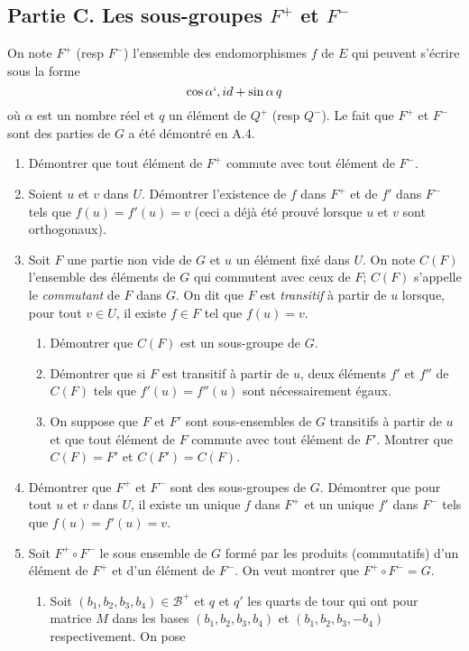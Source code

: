 \subsection*{Partie C. Les sous-groupes $F^+$ et $F^-$}
On note $F^+$ (resp $F^-$) l'ensemble des endomorphismes $f$ de $E$ qui peuvent s'écrire sous la forme
\[\cos \alpha `, id + \sin \alpha \, q\]
où $\alpha$ est un nombre réel et $q$ un élément de $Q^+$ (resp $Q^-$). Le fait que $F^+$ et $F^-$ sont des parties de $G$ a été démontré en A.4.
\begin{enumerate}
\item Démontrer que tout élément de $F^+$ commute avec tout élément de $F^-$.
\item Soient $u$ et $v$ dans $U$. Démontrer l'existence de $f$ dans $F^+$ et de $f'$ dans $F^-$ tels que $f(u)=f'(u)=v$ (ceci a déjà été prouvé lorsque $u$ et $v$ sont orthogonaux).
\item Soit $F$ une partie non vide de $G$ et $u$ un élément fixé dans $U$.\newline
On note $C(F)$ l'ensemble des éléments de $G$ qui commutent avec ceux de $F$; $C(F)$ s'appelle le \emph{commutant} de $F$ dans $G$.\newline
On dit que $F$ est \emph{transitif} à partir de $u$ lorsque, pour tout $v\in U$, il existe $f\in F$ tel que $f(u)=v$.
\begin{enumerate}
\item Démontrer que $C(F)$ est un sous-groupe de $G$.
\item Démontrer que si $F$ est transitif à partir de $u$, deux éléments $f'$ et $f''$ de $C(F)$ tels que $f'(u)=f''(u)$ sont nécessairement égaux.
\item On suppose que $F$ et $F'$ sont sous-ensembles de $G$ transitifs à partir de $u$ et que tout élément de $F$ commute avec tout élément de $F'$. Montrer que $C(F)=F'$ et $C(F')=C(F)$.
\end{enumerate}
\item Démontrer que $F^+$ et $F^-$ sont des sous-groupes de $G$. Démontrer que pour tout $u$ et $v$ dans $U$, il existe un unique $f$ dans $F^+$ et un unique $f'$ dans $F^-$ tels que $f(u)=f'(u)=v$.
\item Soit $F^+ \circ F^-$ le sous ensemble de $G$ formé par les produits (commutatifs) d'un élément de $F^+$ et d'un élément de $F^-$.\newline
 On veut montrer que $F^+ \circ F^-=G$.
\begin{enumerate}
\item Soit $(b_1,b_2,b_3,b_4)\in \mathcal{B}^+$ et $q$ et $q'$ les quarts de tour qui ont pour matrice $M$ dans les bases $(b_1,b_2,b_3,b_4)$ et $(b_1,b_2,b_3,-b_4)$ respectivement. On pose

\end{enumerate}
\end{enumerate}
